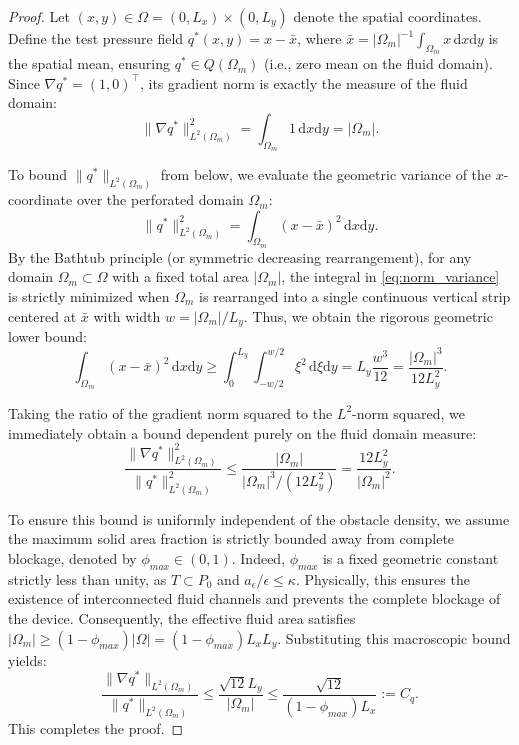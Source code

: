 \documentclass{elsarticle}
\begin{document}
\begin{proof}
    Let $(x, y) \in \Omega = (0, L_x) \times (0, L_y)$ denote the spatial coordinates. Define the test pressure field $q^*(x, y) = x - \bar{x}$, where $\bar{x} = |\Omega_m|^{-1} \int_{\Omega_m} x \, \mathrm{d}x\mathrm{d}y$ is the spatial mean, ensuring $q^* \in Q(\Omega_m)$ (i.e., zero mean on the fluid domain). Since $\nabla q^* = (1, 0)^\top$, its gradient norm is exactly the measure of the fluid domain:
    \begin{equation}
        \|\nabla q^*\|_{L^2(\Omega_m)}^2 = \int_{\Omega_m} 1 \, \mathrm{d}x\mathrm{d}y = |\Omega_m|.
    \end{equation}

    To bound $\|q^*\|_{L^2(\Omega_m)}$ from below, we evaluate the geometric variance of the $x$-coordinate over the perforated domain $\Omega_m$:
    \begin{equation} \label{eq:norm_variance}
        \|q^*\|_{L^2(\Omega_m)}^2 = \int_{\Omega_m} (x - \bar{x})^2 \, \mathrm{d}x\mathrm{d}y.
    \end{equation}
    By the Bathtub principle (or symmetric decreasing rearrangement), for any domain $\Omega_m \subset \Omega$ with a fixed total area $|\Omega_m|$, the integral in \eqref{eq:norm_variance} is strictly minimized when $\Omega_m$ is rearranged into a single continuous vertical strip centered at $\bar{x}$ with width $w = |\Omega_m| / L_y$. Thus, we obtain the rigorous geometric lower bound:
    \begin{equation}
        \int_{\Omega_m} (x - \bar{x})^2 \, \mathrm{d}x\mathrm{d}y \ge \int_0^{L_y} \int_{-w/2}^{w/2} \xi^2 \, \mathrm{d}\xi \mathrm{d}y = L_y \frac{w^3}{12} = \frac{|\Omega_m|^3}{12 L_y^2}.
    \end{equation}

    Taking the ratio of the gradient norm squared to the $L^2$-norm squared, we immediately obtain a bound dependent purely on the fluid domain measure:
    \begin{equation}
        \frac{\|\nabla q^*\|_{L^2(\Omega_m)}^2}{\|q^*\|_{L^2(\Omega_m)}^2} \le \frac{|\Omega_m|}{|\Omega_m|^3 / (12 L_y^2)} = \frac{12 L_y^2}{|\Omega_m|^2}.
    \end{equation}

    To ensure this bound is uniformly independent of the obstacle density, we assume the maximum solid area fraction is strictly bounded away from complete blockage, denoted by $\phi_{max} \in (0, 1)$. Indeed, $\phi_{max}$ is a fixed geometric constant strictly less than unity, as $T \subset P_0$ and $a_\epsilon/\epsilon \le \kappa$. Physically, this ensures the existence of interconnected fluid channels and prevents the complete blockage of the device. Consequently, the effective fluid area satisfies $|\Omega_m| \ge (1 - \phi_{max})|\Omega| = (1 - \phi_{max}) L_x L_y$. Substituting this macroscopic bound yields:
    \begin{equation}
        \frac{\|\nabla q^*\|_{L^2(\Omega_m)}}{\|q^*\|_{L^2(\Omega_m)}} \le \frac{\sqrt{12} L_y}{|\Omega_m|} \le \frac{\sqrt{12}}{(1 - \phi_{max}) L_x} := C_q.
    \end{equation}
    This completes the proof.
\end{proof}
\end{document}

